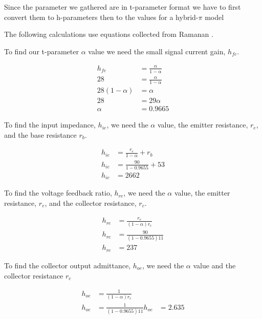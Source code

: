 \documentclass[conference]{IEEEtran}
\begin{document}
Since the parameter we gathered are in t-parameter format we have to first convert them to h-parameters then to the values for
a hybrid-$\pi$ model

The following calculations use equations collected from Ramanan \cite{ramanan_functional_1985}.

To find our t-parameter $\alpha$ value we need the small signal current gain, $h_{fe}$.

\begin{equation}
    \begin{aligned}
        h_{fe} &= \frac{\alpha}{1 - \alpha} \\
        28 &= \frac{\alpha}{1 - \alpha} \\
        28 (1 - \alpha) &= \alpha \\
        28 &= 29 \alpha \\
        \alpha &= 0.9665
    \end{aligned}
\end{equation}

To find the input impedance, $h_{ie}$, we need the $\alpha$ value, the emitter resistance, $r_e$, and the base
resistance $r_b$.

\begin{equation}
    \begin{aligned}
        h_{ie} &= \frac{r_e}{1 - \alpha} + r_b \\
        h_{ie} &= \frac{90}{1 - 0.9655} + 53 \\
        h_{ie} &= 2662
    \end{aligned}
\end{equation}

To find the voltage feedback ratio, $h_{re}$, we need the $\alpha$ value, the emitter resistance, $r_e$, and the
collector resistance, $r_c$.

\begin{equation}
    \begin{aligned}
        h_{re} &= \frac{r_e}{\left(1 - \alpha\right) r_c} \\
        h_{re} &= \frac{90}{\left(1 - 0.9655\right) 11} \\
        h_{re} &= 237
    \end{aligned}
\end{equation}

To find the collector output admittance, $h_{oe}$, we need the $\alpha$ value and the collector resistance $r_c$

\begin{equation}
    \begin{aligned}
        h_{oe} &= \frac{1}{\left(1 - \alpha \right) r_c} \\
        h_{oe} &= \frac{1}{\left(1 - 0.9655\right) 11}
        h_{oe} &= 2.635
    \end{aligned}
\end{equation}
\end{document}
